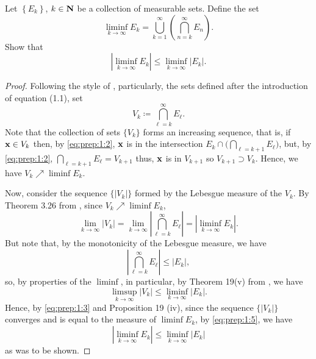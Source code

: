 \begin{problem}
Let $\left\{ E_k \right\}$, $k\in\mathbf{N}$ be a collection of measurable
sets. Define the set
\[
\liminf_{k\to\infty} E_k
=\bigcup_{k=1}^\infty\left(\bigcap_{n=k}^\infty E_n\right).
\]
Show that
\[
\left|\liminf_{k\to\infty} E_k\right|\leq\liminf_{k\to\infty}\left|E_k\right|.
\]
\end{problem}
\begin{proof}
Following the style of \cite[Ch.\@ 1, p.\@ 2]{wheeden-zygmund},
particularly, the sets defined after the introduction of equation (1.1),
set
\begin{equation}
\label{eq:prep:1:2}
V_k\coloneqq\bigcap_{\ell=k}^\infty E_\ell.
\end{equation}
Note that the collection of sets $\{V_k\}$ forms an increasing
sequence, that is, if $\mathbf{x}\in V_k$ then, by \eqref{eq:prep:1:2}, $\mathbf{x}$ is
in the intersection $E_k\cap\bigl(\bigcap_{\ell=k+1}E_\ell\bigr)$, but, by
\eqref{eq:prep:1:2}, $\bigcap_{\ell=k+1}E_\ell=V_{k+1}$ thus, $\mathbf{x}$
is in $V_{k+1}$ so $V_{k+1}\supset V_k$. Hence, we have $V_k\nearrow\liminf
E_k$.

Now, consider the sequence $\{|V_k|\}$ formed by the Lebesgue measure of
the $V_k$. By Theorem 3.26 from \cite[Ch.\@ 3, p.\@
51]{wheeden-zygmund}, since $V_k\nearrow\liminf E_k$,
\begin{equation}
  \label{eq:prep:1:3}
\lim_{k\to\infty}|V_k|=
\lim_{k\to\infty}\left|\bigcap_{\ell=k}^\infty E_\ell\right|=
\left|\liminf_{k\to\infty} E_k\right|.
\end{equation}
But note that, by the monotonicity of the Lebesgue measure, we have
\begin{equation}
  \label{eq:prep:1:4}
\left|\bigcap_{\ell=k}^\infty E_\ell\right|\leq |E_k|,
\end{equation}
so, by properties of the $\liminf$, in particular, by Theorem 19(v) from
\cite[Ch.\@ 1, p.\@ 23]{royden}, we have
\begin{equation}
\label{eq:prep:1:5}
\limsup_{k\to\infty}|V_k|\leq\liminf_{k\to\infty}|E_k|.
\end{equation}
Hence, by \eqref{eq:prep:1:3} and Proposition 19 (iv), since the sequence
$\{|V_k|\}$ converges and is equal to the measure of $\liminf E_k$, by
\eqref{eq:prep:1:5}, we have
\begin{equation}
\label{eq:prep:1:6}
\left|\liminf_{k\to\infty} E_k\right|\leq\liminf_{k\to\infty}|E_k|
\end{equation}
as was to be shown.
\end{proof}

